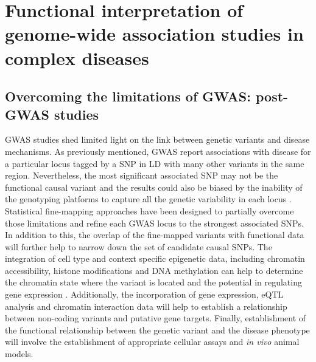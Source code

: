 

	


\section{Functional interpretation of genome-wide association studies in complex diseases}

\subsection{Overcoming the limitations of GWAS: post-GWAS studies}
GWAS studies shed limited light on the link between genetic variants and disease mechanisms. As previously mentioned, GWAS report associations with disease for a particular locus tagged by a SNP in LD with many other variants in the same region. Nevertheless, the most significant associated SNP may not be the functional causal variant and the results could also be biased by the inability of the genotyping platforms to capture all the genetic variability in each locus . Statistical fine-mapping approaches have been designed to partially overcome those limitations and refine each GWAS locus to the strongest associated SNPs. In addition to this, the overlap of the fine-mapped variants with functional data will further help to narrow down the set of candidate causal SNPs. The integration of cell type and context specific epigenetic data, including chromatin accessibility, histone modifications and DNA methylation can help to determine the chromatin state where the variant is located and the potential in regulating gene expression . Additionally, the incorporation of gene expression, eQTL analysis and chromatin interaction data will help to establish a relationship between non-coding variants and putative gene targets. Finally, establishment of the functional relationship between the genetic variant and the disease phenotype will involve the establishment of appropriate cellular assays and \textit{in vivo} animal models.


